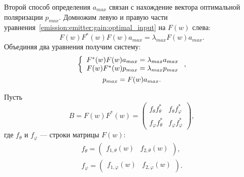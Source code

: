 Второй способ определения $a_{max}$ связан с нахождение вектора оптимальной поляризации $p_{max}$. Домножим левую и правую части
уравнения~\eqref{emission:emitter:gain:optimal_input} на $F(w)$ слева:
\[
    F(w) F^*(w) F(w) a_{max} = \lambda_{max} F(w) a_{max} .
\]
Объединяя два уравнения получим систему:
\begin{gather}
    \left \{
    \begin{array}{c}
        F^*(w) F(w) a_{max} = \lambda_{max} a_{max} \\
        F(w) F^*(w) p_{max} = \lambda_{max} p_{max}
    \end{array}
    \right .
    \label{emission:emitter:gain:system}, \\
    p_{max} = F(w) a_{max} \notag.
\end{gather}

Пусть
\[
    B
    = F(w) F^*(w)
    = \begin{pmatrix}
          f_\theta f_\theta^*  & f_{\theta} f_\varphi^* \\
          f_\varphi f_\theta^* & f_\varphi f_\varphi^*
    \end{pmatrix} ,
\]
где $f_\theta$ и $f_\varphi$ --- строки матрицы $F(w)$:
\begin{gather*}
    f_\theta
    = \begin{pmatrix}
          f_{1,\theta}(w) & f_{2,\theta}(w)
    \end{pmatrix}, \\
%
    f_\varphi
    = \begin{pmatrix}
          f_{1,\varphi}(w) & f_{2,\varphi}(w)
    \end{pmatrix} .
\end{gather*}

